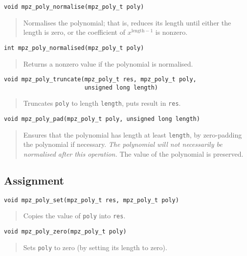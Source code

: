 \documentclass[a4paper,10pt]{article}
\newcommand{\code}{\lstinline}
\begin{document}
\begin{lstlisting}
void mpz_poly_normalise(mpz_poly_t poly)
\end{lstlisting}
\begin{quote}
Normalises the polynomial; that is, reduces its length until either the length is zero, or the coefficient of $x^{\text{length} - 1}$ is nonzero.
\end{quote}

\begin{lstlisting}
int mpz_poly_normalised(mpz_poly_t poly)
\end{lstlisting}
\begin{quote}
Returns a nonzero value if the polynomial is normalised.
\end{quote}


\begin{lstlisting}
void mpz_poly_truncate(mpz_poly_t res, mpz_poly_t poly,
                       unsigned long length)
\end{lstlisting}
\begin{quote}
Truncates \code{poly} to length \code{length}, puts result in \code{res}.
\end{quote}


\begin{lstlisting}
void mpz_poly_pad(mpz_poly_t poly, unsigned long length)
\end{lstlisting}
\begin{quote}
Ensures that the polynomial has length at least \code{length}, by zero-padding the polynomial if necessary. \emph{The polynomial will not necessarily be normalised after this operation.} The value of the polynomial is preserved.
\end{quote}



\subsection{Assignment}

\begin{lstlisting}
void mpz_poly_set(mpz_poly_t res, mpz_poly_t poly)
\end{lstlisting}
\begin{quote}
Copies the value of \code{poly} into \code{res}.
\end{quote}

\begin{lstlisting}
void mpz_poly_zero(mpz_poly_t poly)
\end{lstlisting}
\begin{quote}
Sets \code{poly} to zero (by setting its length to zero).
\end{quote}
\end{document}
